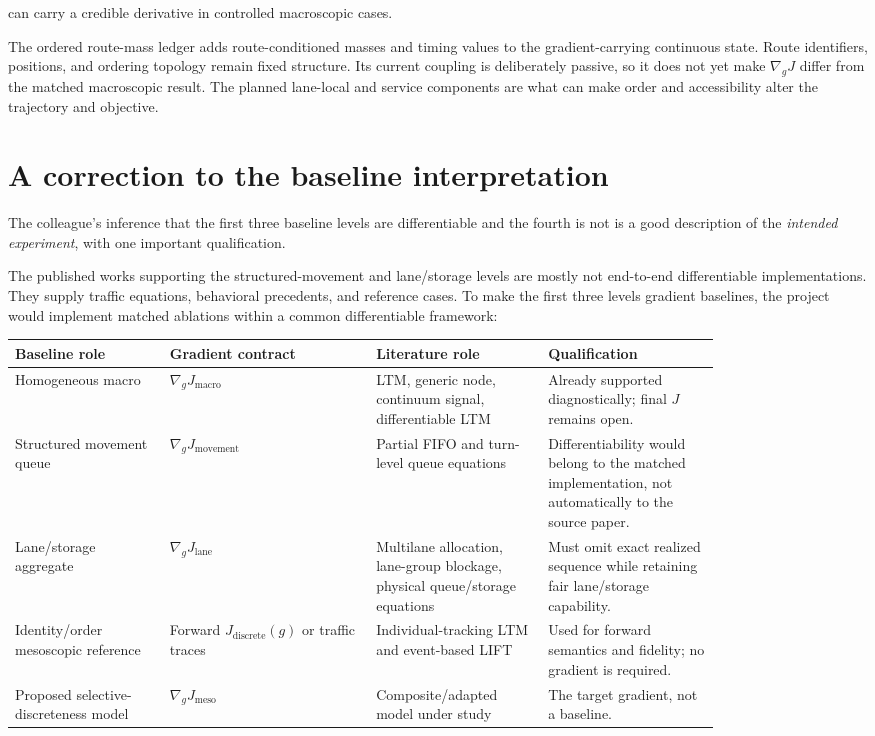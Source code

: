 \documentclass[11pt,a4paper]{article}
\begin{document}
can carry a credible derivative in controlled macroscopic cases.

The ordered route-mass ledger adds route-conditioned masses and timing values to the gradient-carrying continuous state. Route identifiers, positions, and ordering topology remain fixed structure. Its current coupling is deliberately passive, so it does not yet make $\nabla_gJ$ differ from the matched macroscopic result. The planned lane-local and service components are what can make order and accessibility alter the trajectory and objective.

\section{A correction to the baseline interpretation}

The colleague's inference that the first three baseline levels are differentiable and the fourth is not is a good description of the \emph{intended experiment}, with one important qualification.

The published works supporting the structured-movement and lane/storage levels are mostly not end-to-end differentiable implementations. They supply traffic equations, behavioral precedents, and reference cases. To make the first three levels gradient baselines, the project would implement matched ablations within a common differentiable framework:

\small
\begin{longtable}{p{0.18\linewidth}p{0.24\linewidth}p{0.20\linewidth}p{0.20\linewidth}}
\toprule
\textbf{Baseline role} & \textbf{Gradient contract} & \textbf{Literature role} & \textbf{Qualification}\\
\midrule
Homogeneous macro & $\nabla_gJ_{\mathrm{macro}}$ & LTM, generic node, continuum signal, differentiable LTM & Already supported diagnostically; final $J$ remains open.\\
Structured movement queue & $\nabla_gJ_{\mathrm{movement}}$ & Partial FIFO and turn-level queue equations & Differentiability would belong to the matched implementation, not automatically to the source paper.\\
Lane/storage aggregate & $\nabla_gJ_{\mathrm{lane}}$ & Multilane allocation, lane-group blockage, physical queue/storage equations & Must omit exact realized sequence while retaining fair lane/storage capability.\\
Identity/order mesoscopic reference & Forward $J_{\mathrm{discrete}}(g)$ or traffic traces & Individual-tracking LTM and event-based LIFT & Used for forward semantics and fidelity; no gradient is required.\\
Proposed selective-\allowbreak discreteness model & $\nabla_gJ_{\mathrm{meso}}$ & Composite/adapted model under study & The target gradient, not a baseline.\\
\bottomrule
\end{longtable}
\normalsize
\end{document}
